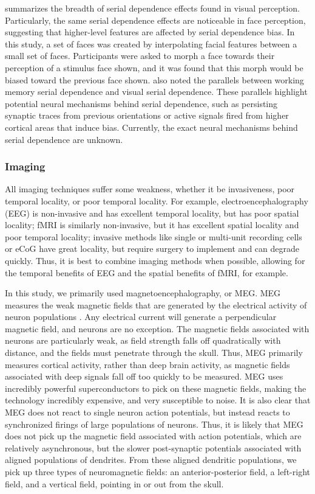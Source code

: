 \documentclass[../main.tex]{subfiles}
\begin{document}
\cite{KIYONAGA2017493} summarizes the breadth of serial dependence effects found in visual perception. Particularly, the same serial dependence effects are noticeable in face perception, suggesting that higher-level features are affected by serial dependence bias. In this study, a set of faces was created by interpolating facial features between a small set of faces. Participants were asked to morph a face towards their perception of a stimulus face shown, and it was found that this morph would be biased toward the previous face shown. \cite{KIYONAGA2017493} also noted the parallels between working memory serial dependence and visual serial dependence. These parallels highlight potential neural mechanisms behind serial dependence, such as persisting synaptic traces from previous orientations or active signals fired from higher cortical areas that induce bias. Currently, the exact neural mechanisms behind serial dependence are unknown.

\subsubsection{Imaging}
All imaging techniques suffer some weakness, whether it be invasiveness, poor temporal locality, or poor temporal locality. For example, electroencephalography (EEG) is non-invasive and has excellent temporal locality, but has poor spatial locality; fMRI is similarly non-invasive, but it has excellent spatial locality and poor temporal locality; invasive methods like single or multi-unit recording cells or eCoG have great locality, but require surgery to implement and can degrade quickly. Thus, it is best to combine imaging methods when possible, allowing for the temporal benefits of EEG and the spatial benefits of fMRI, for example. 

In this study, we primarily used magnetoencephalography, or MEG. MEG measures the weak magnetic fields that are generated by the electrical activity of neuron populations \citep{senior_russell_gazzaniga_2006}. Any electrical current will generate a perpendicular magnetic field, and neurons are no exception. The magnetic fields associated with neurons are particularly weak, as field strength falls off quadratically with distance, and the fields must penetrate through the skull. Thus, MEG primarily measures cortical activity, rather than deep brain activity, as magnetic fields associated with deep signals fall off too quickly to be measured. MEG uses incredibly powerful superconductors to pick on these magnetic fields, making the technology incredibly expensive, and very susceptible to noise. It is also clear that MEG does not react to single neuron action potentials, but instead reacts to synchronized firings of large populations of neurons. Thus, it is likely that MEG does not pick up the magnetic field associated with action potentials, which are relatively asynchronous, but the slower post-synaptic potentials associated with aligned populations of dendrites. From these aligned dendritic populations, we pick up three types of neuromagnetic fields: an anterior-posterior field, a left-right field, and a vertical field, pointing in or out from the skull.
\end{document}
